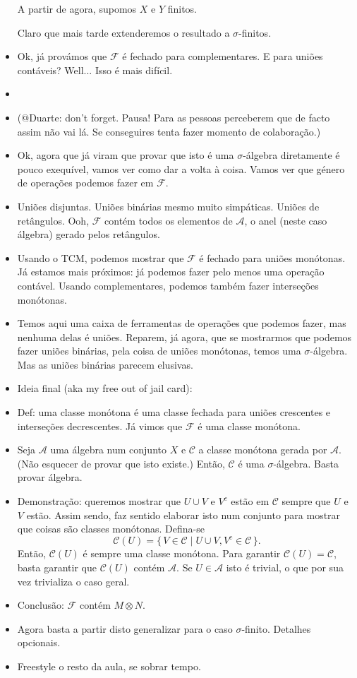\documentclass{article}
\renewcommand{\cal}[1]{\mathcal{#1}}
\begin{document}
\begin{itemize}
\begin{center}
A partir de agora, supomos $X$ e $Y$ finitos.
\end{center}
Claro que mais tarde extenderemos o resultado a $\sigma$-finitos.
\item Ok, já provámos que $\cal F$ é fechado para complementares. E para uniões contáveis? Well... Isso é mais difícil.
\item{}
\item (@Duarte: don't forget. Pausa! Para as pessoas perceberem que de facto assim não vai lá. Se conseguires tenta fazer momento de colaboração.)
\item Ok, agora que já viram que provar que isto é uma $\sigma$-álgebra diretamente é pouco exequível, vamos ver como dar a volta à coisa. Vamos ver que género de operações podemos fazer em $\cal F$.
\item Uniões disjuntas. Uniões binárias mesmo muito simpáticas. Uniões de retângulos. Ooh, $\cal F$ contém todos os elementos de $\cal A$, o anel (neste caso álgebra) gerado pelos retângulos.
\item Usando o TCM, podemos mostrar que $\cal F$ é fechado para uniões monótonas. Já estamos mais próximos: já podemos fazer pelo menos uma operação contável. Usando complementares, podemos também fazer interseções monótonas.
\item Temos aqui uma caixa de ferramentas de operações que podemos fazer, mas nenhuma delas é uniões. Reparem, já agora, que se mostrarmos que podemos fazer uniões binárias, pela coisa de uniões monótonas, temos uma $\sigma$-álgebra. Mas as uniões binárias parecem elusivas.
\item Ideia final (aka my free out of jail card):
\item Def: uma classe monótona é uma classe fechada para uniões crescentes e interseções decrescentes. Já vimos que $\cal F$ é uma classe monótona.
\item Seja $\cal A$ uma álgebra num conjunto $X$ e $\cal C$ a classe monótona gerada por $\cal A$. (Não esquecer de provar que isto existe.) Então, $\cal C$ é uma $\sigma$-álgebra. Basta provar álgebra.
\item Demonstração: queremos mostrar que $U \cup V$ e $V^c$ estão em $\cal C$ sempre que $U$ e $V$ estão. Assim sendo, faz sentido elaborar isto num conjunto para mostrar que coisas são classes monótonas. Defina-se
\[\cal C(U) = \{\,V \in \cal C \mid U \cup V, V^c \in \cal C\,\}.\]
Então, $\cal C(U)$ é sempre uma classe monótona. Para garantir $\cal C(U) = \cal C$, basta garantir que $\cal C(U)$ contém $\cal A$. Se $U \in \cal A$ isto é trivial, o que por sua vez trivializa o caso geral.
\item Conclusão: $\cal F$ contém $M \otimes N$.
\item Agora basta a partir disto generalizar para o caso $\sigma$-finito. Detalhes opcionais.
\item Freestyle o resto da aula, se sobrar tempo.
\end{itemize}
\end{document}
